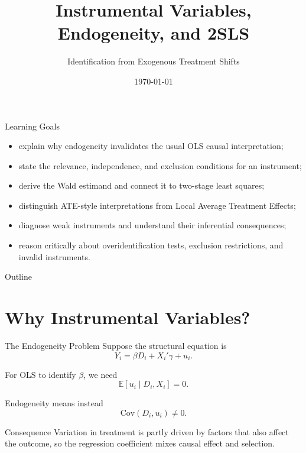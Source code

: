 \documentclass[aspectratio=169,11pt]{beamer}
\title[Instrumental Variables]{Instrumental Variables, Endogeneity, and 2SLS}
\subtitle{Identification from Exogenous Treatment Shifts}
\date{\today}
\newcommand{\E}{\mathbb{E}}
\newcommand{\Cov}{\mathrm{Cov}}
\begin{document}
\begin{frame}
\titlepage
\end{frame}

\begin{frame}{Learning Goals}
\begin{itemize}
\item explain why endogeneity invalidates the usual OLS causal interpretation;
\item state the relevance, independence, and exclusion conditions for an instrument;
\item derive the Wald estimand and connect it to two-stage least squares;
\item distinguish ATE-style interpretations from Local Average Treatment Effects;
\item diagnose weak instruments and understand their inferential consequences;
\item reason critically about overidentification tests, exclusion restrictions, and invalid instruments.
\end{itemize}
\end{frame}

\begin{frame}{Outline}
\tableofcontents
\end{frame}

\section{Why Instrumental Variables?}

\begin{frame}{The Endogeneity Problem}
Suppose the structural equation is
\[
Y_i=\beta D_i+X_i'\gamma+u_i.
\]

For OLS to identify \(\beta\), we need
\[
\E[u_i\mid D_i,X_i]=0.
\]

Endogeneity means instead
\[
\Cov(D_i,u_i)\neq 0.
\]

\begin{alertblock}{Consequence}
Variation in treatment is partly driven by factors that also affect the outcome, so the regression coefficient mixes causal effect and selection.
\end{alertblock}
\end{frame}
\end{document}
